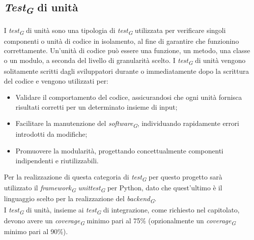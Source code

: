 \subsection{\textit{Test\textsubscript{G}} di unità}
I \textit{test\textsubscript{G}} di unità sono una tipologia di \textit{test\textsubscript{G}} utilizzata per verificare singoli componenti o unità di codice in isolamento, al fine di garantire che funzionino correttamente. Un'unità di codice può essere una funzione, un metodo, una classe o un modulo, a seconda del livello di granularità scelto. I \textit{test\textsubscript{G}} di unità vengono solitamente scritti dagli sviluppatori durante o immediatamente dopo la scrittura del codice e vengono utilizzati per:
\begin{itemize}
    \item Validare il comportamento del codice, assicurandosi che ogni unità fornisca risultati corretti per un determinato insieme di input;
    \item Facilitare la manutenzione del \textit{software\textsubscript{G}}, individuando rapidamente errori introdotti da modifiche;
    \item Promuovere la modularità, progettando concettualmente componenti indipendenti e riutilizzabili.
\end{itemize}
Per la realizzazione di questa categoria di \textit{test\textsubscript{G}} per questo progetto sarà utilizzato il \textit{framework\textsubscript{G}} \textit{unittest\textsubscript{G}} per Python, dato che quest'ultimo è il linguaggio scelto per la realizzazione del \textit{backend\textsubscript{G}}.\\
I \textit{test\textsubscript{G}} di unità, insieme ai \textit{test\textsubscript{G}} di integrazione, come richiesto nel capitolato, devono avere un \textit{coverage\textsubscript{G}} minimo pari al 75\% (opzionalmente un \textit{coverage\textsubscript{G}} minimo pari al 90\%).
